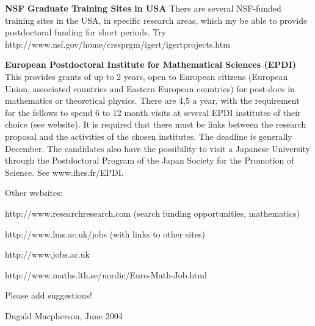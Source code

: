 \medskip

{\bf NSF Graduate Training Sites in USA}  There are several NSF-funded training 
sites in the USA, in specific research areas,
which my be able to provide postdoctoral funding for short periods. Try\\
http://www.nsf.gov/home/crssprgm/igert/igertprojects.htm

\medskip

{\bf European Postdoctoral Institute for Mathematical Sciences (EPDI)} This 
provides grants of up to 2 years, open to European citizens (European Union,
associated countries and Eastern European countries) for post-docs in
mathematics or theoretical physics. There are 4,5 a year, with the
requirement for the fellows to spend 6 to 12 month visits at several EPDI
institutes of their choice (see website). It is required that there
must be links between the research proposal and the activities of the
chosen institutes. The deadline is generally December. The candidates also
have the possibility to visit a Japanese University through the
Postdoctoral Program of the Japan Society for the Promotion of Science. See
www.ihes.fr/EPDI.


\medskip


Other websites:

http://www.researchresearch.com (search funding opportunities, mathematics)

http://www.lms.ac.uk/jobs (with links to other sites)

http://www.jobs.ac.uk

http://www.maths.lth.se/nordic/Euro-Math-Job.html

\medskip

Please add suggestions!

\medskip

Dugald Macpherson, June 2004
